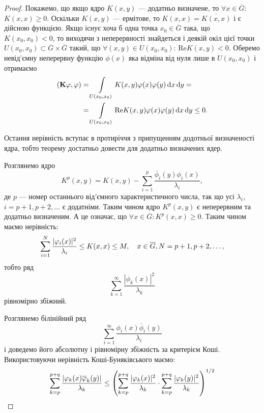 \begin{proof}
    Покажемо, що якщо ядро $K(x,y)$ --- додатньо визначене, то $\forall x\in\overline G$: $K(x,x)\ge0$. Оскільки $K(x,y)$ --- ермітове, то $K(x,x)=\overline {K(x,x)}$ і є дійсною функцією. Якщо існує хоча б одна точка $x_0\in\overline G$ така, що $K(x_0,x_0)<0$, то виходячи з неперервності знайдеться і деякій окіл цієї точки $U(x_0,x_0)\subset\overline G\times\overline G$ такий, що $\forall(x,y)\in U(x_0,x_0)$: $\text{Re} K(x,y)<0$. Оберемо невід'ємну неперервну функцію $\phi(x)$ яка відміна від нуля лише в $U(x_0,x_0)$ і отримаємо
    \begin{equation}
        \begin{aligned}
            (\textbf{K}\varphi,\varphi)&=\displaystyle\int\limits_{U(x_0,x_0)}K(x,y)\varphi(x)\varphi(y)\mathop{}\!\mathrm{d} x\mathop{}\!\mathrm{d} y=\\
            &=\displaystyle\int\limits_{U(x_0,x_0)}\text{Re}K(x,y)\varphi(x)\varphi(y)\mathop{}\!\mathrm{d} x\mathop{}\!\mathrm{d} y\le0.
        \end{aligned}
    \end{equation}

    Остання нерівність вступає в протиріччя з припущенням додотньої визначеності ядра, тобто теорему достатньо довести для додатньо визначених ядер. \medskip

    Розглянемо ядро
    \begin{equation}
        K^p(x,y)=K(x,y)-\sum_{i=1}^p\frac{\overline\phi_i(y)\phi_i(x)}{\lambda_i},
    \end{equation}
    де $p$ --- номер останнього від'ємного характеристичного числа, так що усі $\lambda_i$, $i=p+1,p+2,\ldots$ є додатніми. Таким чином ядро $K^p(x,y)$ є неперервним та додатньо визначеним. А це означає, що $\forall x\in\overline G:K^p(x,x)\ge0$. Таким чином маємо нерівність:
    \begin{equation}
        \displaystyle\sum\limits_{i=1}^N\dfrac{|\varphi_i(x)|^2}{\lambda_i}\le K(x,x)\le M,\quad x\in\overline G, N=p+1,p+2,\ldots,
    \end{equation}
    тобто ряд
    \begin{equation}
        \sum_{k=1}^\infty\frac{|\phi_k(x)|^2}{\lambda_k}
    \end{equation}
    рівномірно збіжний. \medskip

    Розглянемо білінійний ряд 
    \begin{equation}
        \sum_{i=1}^\infty\frac{\phi_i(x)\overline\phi_i(y)}{\lambda_i}
    \end{equation}
    і доведемо його абсолютну і рівномірну збіжність за критерієм Коші. Використовуючи нерівність Коші-Буняківського маємо:
    \begin{equation}
        \displaystyle\sum\limits_{k=p}^{p+q}\dfrac{|\varphi_k(x)\overline{\varphi}_k(y)|}{\lambda_k}\le\left(\displaystyle\sum\limits_{k=p}^{p+q}\dfrac{|\varphi_k(x)|^2}{\lambda_k}\cdot\displaystyle\sum\limits_{k=p}^{p+q}\dfrac{|\varphi_k(y)|^2}{\lambda_k}\right)^{1/2}
    \end{equation}


\end{proof}
